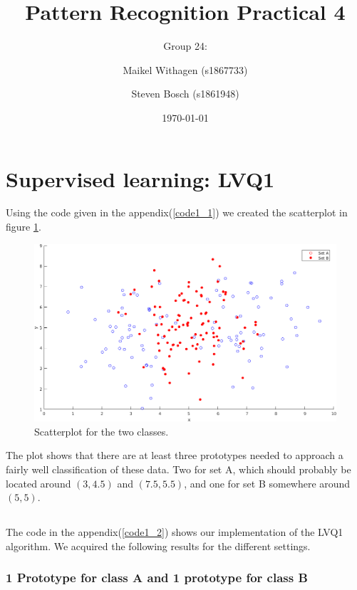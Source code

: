 \documentclass[10pt]{article}
\title{Pattern Recognition Practical 4}
\author{Group 24: \and Maikel Withagen (s1867733) \and Steven Bosch (s1861948)}
\date{\today}
\begin{document}
\maketitle

\section{Supervised learning: LVQ1}
Using the code given in the appendix(\autoref{code1_1}) we created the scatterplot in figure \ref{fig1.1}.

\begin{figure}[H]
 \centering
 \includegraphics[width=\textwidth]{Fig1_1.png}
 \caption{Scatterplot for the two classes.}
 \label{fig1.1}
\end{figure}

The plot shows that there are at least three prototypes needed to approach a fairly well classification of these data. Two for set A, which should probably be located around $(3,4.5)$ and $(7.5, 5.5)$, and one for set B somewhere around $(5,5)$. 

\subsection{}
The code in the appendix(\autoref{code1_2}) shows our implementation of the LVQ1 algorithm. We acquired the following results for the different settings.

\subsubsection{1 Prototype for class A and 1 prototype for class B}
\end{document}
